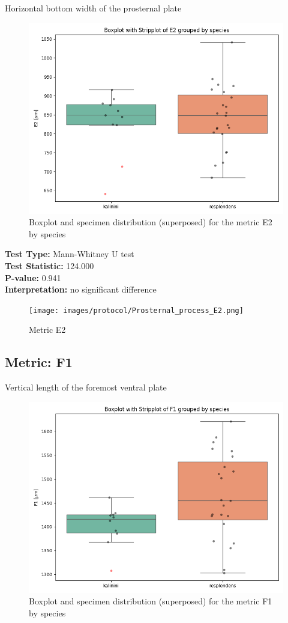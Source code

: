 Horizontal bottom width of the prosternal plate 

\begin{figure}[H]
\centering
\includegraphics[width=0.7\linewidth]{images/boxplot/boxplot_E2.png}
\caption{  Boxplot and specimen distribution (superposed) for the metric  E2 by species}
\end{figure}

\noindent\textbf{Test Type:} Mann-Whitney U test \\
\noindent\textbf{Test Statistic:} 124.000 \\
\noindent\textbf{P-value:} 0.941 \\
\noindent\textbf{Interpretation:} no significant difference

\begin{figure}[H]
\centering
\texttt{[image: images/protocol/Prosternal\_process\_E2.png]}
\caption{ Metric E2}
\end{figure}

\newpage
\subsection*{Metric: F1}

Vertical length of the foremost ventral plate

\begin{figure}[H]
\centering
\includegraphics[width=0.7\linewidth]{images/boxplot/boxplot_F1.png}
\caption{  Boxplot and specimen distribution (superposed) for the metric  F1 by species}
\end{figure}

